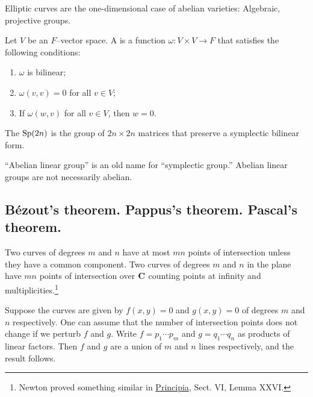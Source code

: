 \documentclass [11 pt, oneside] {article}
\begin{document}
Elliptic curves are the one-dimensional case of abelian varieties: Algebraic, projective groups.

\begin{definition}
Let $V$ be an $F$--vector space. A  is a function $\omega : V\times V \longrightarrow F$ that satisfies the following conditions:
\begin{enumerate}
	\item $\omega$ is bilinear;
	\item $\omega(v,v)=0$ for all $v\in V$;
	\item If $\omega(w,v)$ for all $v\in V$, then $w=0$.
\end{enumerate}

\end{definition}

\begin{definition}
The  $\operatorname{Sp}(2n)$ is the group of $2n\times 2n$ matrices that preserve a symplectic bilinear form.
\end{definition}

\begin{warn}
	``Abelian linear group'' is an old name for ``symplectic group.'' Abelian linear groups are not necessarily abelian.
\end{warn}


\subsection{B\'ezout's theorem. Pappus's theorem. Pascal's theorem.}
\label{s_3}

\begin{theorem}[B\'ezout]
\label{}
Two curves of degrees $m$ and $n$ have at most $mn$ points of intersection unless they have a common component. Two curves of degrees $m$ and $n$ in the plane have $mn$ points of intersection over $\mathbf C$ counting points at infinity and multiplicities.\footnote{Newton proved something similar in \ul{Principia}, Sect. VI, Lemma XXVI.}
\end{theorem}

Suppose the curves are given by $f(x,y)=0$ and $g(x,y)=0$ of degrees $m$ and $n$ respectively. One can assume that the number of intersection points does not change if we perturb $f$ and $g$. Write $f=p_1\cdots p_m$ and $g = q_1\cdots q_n$ as products of linear factors. Then $f$ and $g$ are a union of $m$ and $n$ lines respectively, and the result follows.
\end{document}

